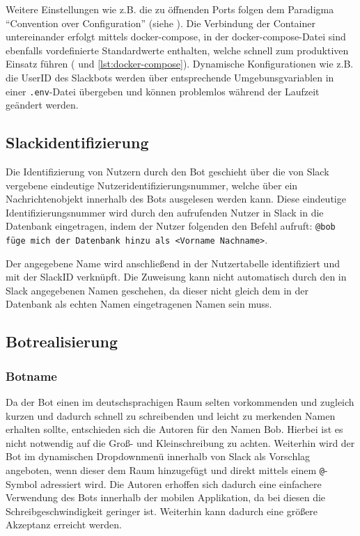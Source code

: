 Weitere Einstellungen wie z.B. die zu öffnenden Ports folgen dem Paradigma \enquote{Convention over Configuration} (siehe \cite{NicholasChenConventionConfiguration2006}). Die Verbindung der Container untereinander erfolgt mittels docker-compose, in der docker-compose-Datei sind ebenfalls vordefinierte Standardwerte enthalten, welche schnell zum produktiven Einsatz führen (\cite{DockerCompose2018} und \autoref{lst:docker-compose}).
Dynamische Konfigurationen wie z.B. die UserID des Slackbots werden über entsprechende Umgebunsgvariablen in einer \verb+.env+-Datei übergeben und können problemlos während der Laufzeit geändert werden.





\subsection{Slackidentifizierung}

Die Identifizierung von Nutzern durch den Bot geschieht über die von Slack vergebene eindeutige Nutzeridentifizierungsnummer, welche über ein Nachrichtenobjekt innerhalb des Bots ausgelesen werden kann. Diese eindeutige Identifizierungsnummer wird durch den aufrufenden Nutzer in Slack in die Datenbank eingetragen, indem der Nutzer folgenden den Befehl aufruft: 
\texttt{@bob füge mich der Datenbank hinzu als <Vorname Nachname>}.

Der angegebene Name wird anschließend in der Nutzertabelle identifiziert und mit der SlackID verknüpft. Die Zuweisung kann nicht automatisch durch den in Slack angegebenen Namen geschehen, da dieser nicht gleich dem in der Datenbank als echten Namen eingetragenen Namen sein muss.



\subsection{Botrealisierung}
\subsubsection{Botname}
Da der Bot einen im deutschsprachigen Raum selten vorkommenden und zugleich kurzen und dadurch schnell zu schreibenden und leicht zu merkenden Namen erhalten sollte, entschieden sich die Autoren für den Namen Bob. Hierbei ist es nicht notwendig auf die Groß- und Kleinschreibung zu achten. Weiterhin wird der Bot im dynamischen Dropdownmenü innerhalb von Slack als Vorschlag angeboten, wenn dieser dem Raum hinzugefügt und direkt mittels einem \texttt{@}-Symbol adressiert wird. Die Autoren erhoffen sich dadurch eine einfachere Verwendung des Bots innerhalb der mobilen Applikation, da bei diesen die Schreibgeschwindigkeit geringer ist. Weiterhin kann dadurch eine größere Akzeptanz erreicht werden.

